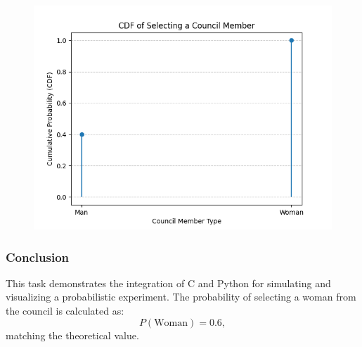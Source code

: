 \documentclass{beamer}
\begin{document}
\begin{frame}
\begin{figure}[h!]
   \centering
   \includegraphics[width=\columnwidth]{figs/fig3.png}
   \end{figure}
\end{frame}
\begin{frame}
\frametitle{Conclusion}
This task demonstrates the integration of C and Python for simulating and visualizing a probabilistic experiment.  
The probability of selecting a woman from the council is calculated as:
\[
P(\text{Woman}) = 0.6,
\]
matching the theoretical value.
\end{frame}
\end{document}
